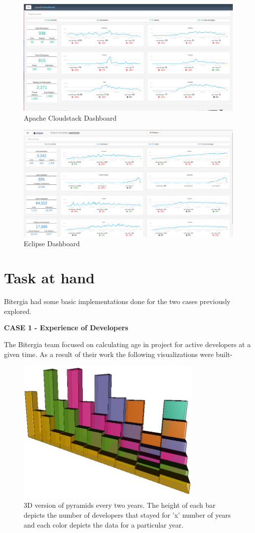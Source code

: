 \documentclass[double,12pt]{beavtex}
\begin{document}
\begin{figure}[H]
\centering
\includegraphics[width=120mm]{apache.png}
\caption{Apache Cloudstack Dashboard}
\end{figure}

\begin{figure}[H]
\centering
\includegraphics[width=120mm]{eclipse.png}
\caption{Eclipse Dashboard}
\end{figure}

\section{Task at hand}
Bitergia had some basic implementations done for the two cases previously explored. 

\textbf{CASE 1 - Experience of Developers}

The Bitergia team focused on calculating age in project for active developers at a given time. As a result of their work the following visualizations were built-

\begin{figure}[!ht]
\centering
\includegraphics[width=90mm]{age2.png}
\caption{3D version of pyramids every two years. The height of each bar depicts the number of developers that stayed for 'x' number of years and each color depicts the data for a particular year.}
\end{figure}
\end{document}
